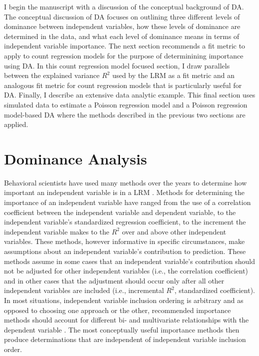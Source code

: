 \documentclass[man]{apa7}
\begin{document}
	I begin the manuscript with a discussion of the conceptual background of DA.
	The conceptual discussion of DA focuses on outlining three different levels of dominance between independent variables, how these levels of dominance are determined in the data, and what each level of dominance means in terms of independent variable importance.
	The next section recommends a fit metric to apply to count regression models for the purpose of determinining importance using DA.
	In this count regression model focused section, I draw parallels between the explained variance $R^2$ used by the LRM as a fit metric and an analogous fit metric for count regression models that is particularly useful for DA.
	Finally, I describe an extensive data analytic example.
	This final section uses simulated data to estimate a Poisson regression model and a Poisson regression model-based DA where the methods described in the previous two sections are applied.
		
\section{Dominance Analysis}

	Behavioral scientists have used many methods over the years to determine how important an independent variable is in a LRM \parencite[see reviews in][]{gromping2007estimators, johnson2004history}.
	Methods for determining the importance of an independent variable have ranged from the use of a correlation coefficient between the independent variable and dependent variable, to the independent variable's standardized regression coefficient, to the increment the independent variable makes to the $R^2$ over and above other independent variables.
	These methods, however informative in specific circumstances, make assumptions about an independent variable's contribution to prediction.
	These methods assume in some cases that an independent variable's contribution should not be adjusted for other independent variables (i.e., the correlation coefficient) and in other cases that the adjustment should occur only after all other independent variables are included (i.e., incremental $R^2$, standardized coefficient).
	In most situations, independent variable inclusion ordering is arbitrary and as opposed to choosing one approach or the other, recommended importance methods should account for different bi- and multivariate relationships with the dependent variable \parencite{johnson2004history}.
	The most conceptually useful importance methods then produce determinations that are independent of independent variable inclusion order.
	
\end{document}
